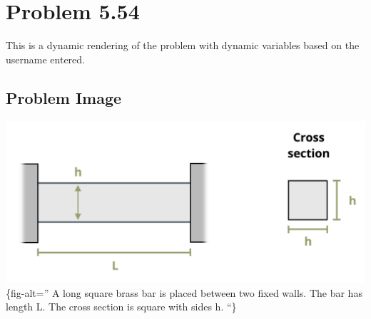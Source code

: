 \documentclass[
  letterpaper,
  DIV=11,
  numbers=noendperiod]{scrreprt}
\begin{document}
\chapter*{Problem 5.54}\label{problem-5.54}


This is a dynamic rendering of the problem with dynamic variables based
on the username entered.

\section*{Problem Image}\label{problem-image-33}


\includegraphics{images/226.png}\{fig-alt='' A long square brass bar is
placed between two fixed walls. The bar has length L. The cross section
is square with sides h. ``\}
\end{document}
